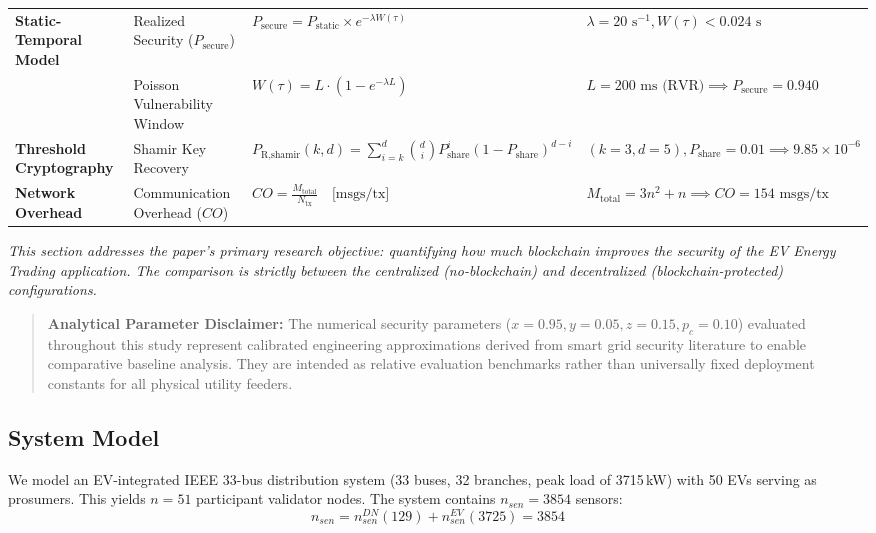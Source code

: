 \documentclass[10pt,twocolumn,journal]{IEEEtran}
\begin{document}
\begin{table}[htbp]
\begin{tabular}{@{}llll@{}}
\textbf{Static-Temporal Model} & Realized Security ($P_{\text{secure}}$) & $P_{\text{secure}} = P_{\text{static}} \times e^{-\lambda W(\tau)}$ & $\lambda = 20\text{ s}^{-1}, W(\tau) < 0.024\text{ s}$ \\
& Poisson Vulnerability Window & $W(\tau) = L \cdot \left(1 - e^{-\lambda L}\right)$ & $L = 200\text{ ms (RVR)} \implies P_{\text{secure}} = 0.940$ \\
\textbf{Threshold Cryptography} & Shamir Key Recovery & $P_{\text{R,shamir}}(k,d) = \sum_{i=k}^{d} \binom{d}{i} P_{\text{share}}^i (1 - P_{\text{share}})^{d-i}$ & $(k=3, d=5), P_{\text{share}}=0.01 \implies 9.85 \times 10^{-6}$ \\
\textbf{Network Overhead} & Communication Overhead ($CO$) & $CO = \frac{M_{\text{total}}}{N_{\text{tx}}} \quad \text{[msgs/tx]}$ & $M_{\text{total}} = 3n^2+n \implies CO = 154\text{ msgs/tx}$ \\
\bottomrule
\end{tabular}
\end{table}


\label{sec:part1}

\emph{This section addresses the paper's primary research objective: quantifying how much blockchain improves the security of the EV Energy Trading application. The comparison is strictly between the centralized (no-blockchain) and decentralized (blockchain-protected) configurations.}


\label{sec:vulnerability_no_bc}



\begin{quote}
\small \textbf{Analytical Parameter Disclaimer:} The numerical security parameters ($x=0.95, y=0.05, z=0.15, p_c=0.10$) evaluated throughout this study represent calibrated engineering approximations derived from smart grid security literature to enable comparative baseline analysis. They are intended as relative evaluation benchmarks rather than universally fixed deployment constants for all physical utility feeders.
\end{quote}


\subsection{System Model}

We model an EV-integrated IEEE 33-bus distribution system (33 buses, 32 branches, peak load of 3715\,kW) with 50 EVs serving as prosumers. This yields $n=51$ participant validator nodes. The system contains $n_{sen} = 3854$ sensors:
\begin{equation}
n_{sen} = n_{sen}^{DN} (129) + n_{sen}^{EV} (3725) = 3854
\end{equation}
\end{document}
